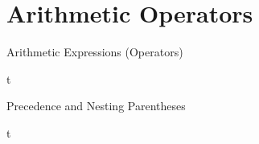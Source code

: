 \documentclass[../lecture2-variablesandcontrolstructures.tex]{subfiles}
\begin{document}
\section{Arithmetic Operators}


\begin{frame}[fragile]{Arithmetic Expressions (Operators)}

t

\end{frame}


\begin{frame}[fragile]{Precedence and Nesting Parentheses}

t

\end{frame}

\end{document}
